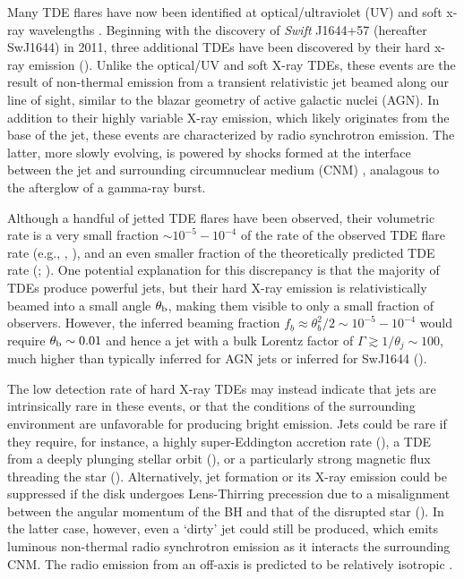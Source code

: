 \documentclass[usenatbib,fleqn]{mnras}
\begin{document}
Many TDE flares have now been identified at optical/ultraviolet (UV)
\citep{Gezari+2008, Gezari+2009, van-Velzen+2011, Gezari+2012,
  Arcavi+2014, Chornock+2014, Holoien+2014, Vinko+2015, Holoien+2016}
and soft x-ray wavelengths \citep{Bade+1996, Grupe+1999,
  Komossa&Greiner1999, Greiner+2000, Esquej+2007, Maksym+2010,
  Saxton+2012}. Beginning with the discovery of {\it Swift} J1644+57
(hereafter SwJ1644) in 2011, three additional TDEs have been
discovered by their hard x-ray emission (\citealt{Bloom+2011,
  Levan+2011, Burrows+2011, Zauderer+2011, Cenko+2012, Pasham+2015,
  Brown+2015}).  Unlike the optical/UV and soft X-ray TDEs, these
events are the result of non-thermal emission from a transient
relativistic jet beamed along our line of sight, similar to the blazar
geometry of active galactic nuclei (AGN).  In addition to their highly
variable X-ray emission, which likely originates from the base of the
jet, these events are characterized by radio synchrotron emission.
The latter, more slowly evolving, is powered by shocks formed at the
interface between the jet and surrounding circumnuclear medium (CNM)
\citep{Bloom+2011,Giannios&Metzger2011,Metzger+2012,De-Colle+2012,Mimica+2015},
analagous to the afterglow of a gamma-ray burst.

Although a handful of jetted TDE flares have been observed, their
volumetric rate is a very small fraction $\sim 10^{-5}-10^{-4}$ of the
rate of the observed TDE flare rate (e.g., \citealt{Burrows+2011},
\citealt{Brown+2015}), and an even smaller fraction of the
theoretically predicted TDE rate (\citealt{Wang&Merritt04}; \citealt{Stone&Metzger2016}).  One
potential explanation for this discrepancy is that the majority of
TDEs produce powerful jets, but their hard X-ray emission is
relativistically beamed into a small angle $\theta_{\rm b}$, making
them visible to only a small fraction of observers.  However, the
inferred beaming fraction $f_b \approx \theta_{b}^{2}/2 \sim
10^{-5}-10^{-4}$ would require $\theta_{\rm b} \sim 0.01$ and hence a
jet with a bulk Lorentz factor of $\Gamma \gtrsim 1/\theta_j \sim
100$, much higher than typically inferred for AGN jets or inferred for
SwJ1644 (\citealt{Metzger+2012}).

The low detection rate of hard X-ray TDEs may instead indicate that
jets are intrinsically rare in these events, or that the conditions of the
surrounding environment are unfavorable for producing bright emission.
Jets could be rare if they require, for instance, a highly
super-Eddington accretion rate (\citealt{De-Colle+2012}), a TDE from a
deeply plunging stellar orbit (\citealt{Metzger&Stone2015}), or a
particularly strong magnetic flux threading the star
(\citealt{Tchekhovskoy+2014,Kelley+2014}).  Alternatively, jet formation
or its X-ray emission could be suppressed if the disk undergoes
Lens-Thirring precession due to a misalignment between the angular
momentum of the BH and that of the disrupted star
(\citealt{Stone&Loeb2012}).  In the latter case, however, even a `dirty'
jet could still be produced, which emits luminous non-thermal radio
synchrotron emission as it interacts the surrounding CNM.  The radio
emission from an off-axis is predicted to be relatively isotropic
\citep{Giannios&Metzger2011,Mimica+2015}.
\end{document}
